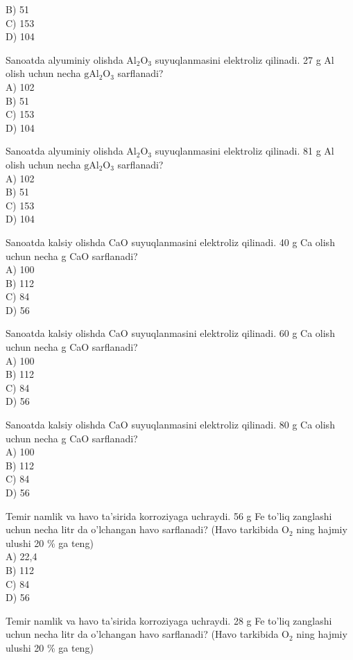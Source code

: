 B) 51\\
C) 153\\
D) 104
  \item Sanoatda alyuminiy olishda $\mathrm{Al}_{2} \mathrm{O}_{3}$ suyuqlanmasini elektroliz qilinadi. 27 g Al olish uchun necha $\mathrm{g} \mathrm{Al}_{2} \mathrm{O}_{3}$ sarflanadi?\\
A) 102\\
B) 51\\
C) 153\\
D) 104
  \item Sanoatda alyuminiy olishda $\mathrm{Al}_{2} \mathrm{O}_{3}$ suyuqlanmasini elektroliz qilinadi. 81 g Al olish uchun necha $\mathrm{g} \mathrm{Al}_{2} \mathrm{O}_{3}$ sarflanadi?\\
A) 102\\
B) 51\\
C) 153\\
D) 104
  \item Sanoatda kalsiy olishda CaO suyuqlanmasini elektroliz qilinadi. 40 g Ca olish uchun necha g CaO sarflanadi?\\
A) 100\\
B) 112\\
C) 84\\
D) 56
  \item Sanoatda kalsiy olishda CaO suyuqlanmasini elektroliz qilinadi. 60 g Ca olish uchun necha g CaO sarflanadi?\\
A) 100\\
B) 112\\
C) 84\\
D) 56
  \item Sanoatda kalsiy olishda CaO suyuqlanmasini elektroliz qilinadi. 80 g Ca olish uchun necha g CaO sarflanadi?\\
A) 100\\
B) 112\\
C) 84\\
D) 56
  \item Temir namlik va havo ta'sirida korroziyaga uchraydi. 56 g Fe to'liq zanglashi uchun necha litr da o'lchangan havo sarflanadi? (Havo tarkibida $\mathrm{O}_{2}$ ning hajmiy ulushi 20 \% ga teng)\\
A) 22,4\\
B) 112\\
C) 84\\
D) 56
  \item Temir namlik va havo ta'sirida korroziyaga uchraydi. 28 g Fe to'liq zanglashi uchun necha litr da o'lchangan havo sarflanadi? (Havo tarkibida $\mathrm{O}_{2}$ ning hajmiy ulushi 20 \% ga teng)\\
